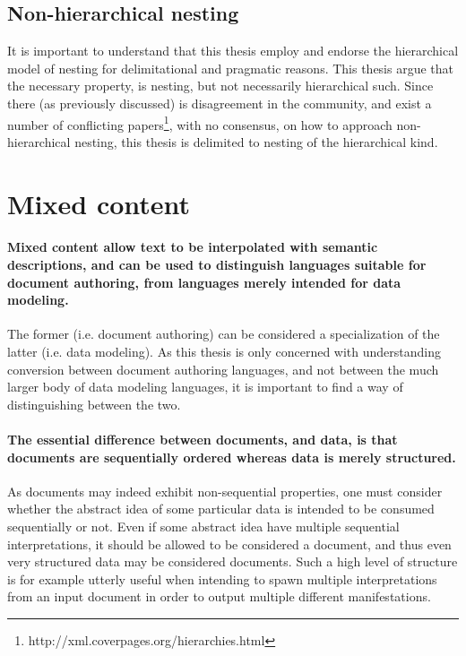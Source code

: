 \documentclass{scrreprt}
\begin{document}
\subsection{Non-hierarchical nesting}
\label{sec:non-hierarchical-nesting}
It is important to understand that this thesis employ and endorse the hierarchical model of nesting for delimitational and pragmatic reasons. This thesis argue that the necessary property, is nesting, but not necessarily hierarchical such. Since there (as previously discussed) is disagreement in the community, and exist a number of conflicting papers\footnote{http://xml.coverpages.org/hierarchies.html}, with no consensus, on how to approach non-hierarchical nesting, this thesis is delimited to nesting of the hierarchical kind.











\section{Mixed content}
\label{sec:mixed-content}
\paragraph{Mixed content allow text to be interpolated with semantic descriptions, and can be used to distinguish languages suitable for document authoring, from languages merely intended for data modeling.} The former (i.e. document authoring) can be considered a specialization of the latter (i.e. data modeling). As this thesis is only concerned with understanding conversion between document authoring languages, and not between the much larger body of data modeling languages, it is important to find a way of distinguishing between the two.

\paragraph{The essential difference between documents, and data, is that documents are sequentially ordered whereas data is merely structured.} As documents may indeed exhibit non-sequential properties, one must consider whether the abstract idea of some particular data is intended to be consumed sequentially or not. Even if some abstract idea have multiple sequential interpretations, it should be allowed to be considered a document, and thus even very structured data may be considered documents. Such a high level of structure is for example utterly useful when intending to spawn multiple interpretations from an input document in order to output multiple different manifestations.
\end{document}
